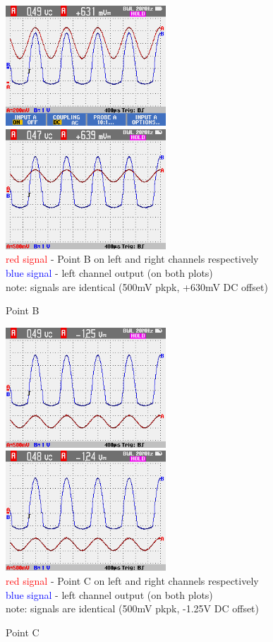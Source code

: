 \documentclass[a4paper,twoside,notitlepage]{article}
\begin{document}
\begin{figure}[hptb!]
    \centering
    \includegraphics[width=6cm]{img_report/left_point_B.png}
    \includegraphics[width=6cm]{img_report/right_point_B.png} \\ 
    \textcolor{Red}{red signal} - Point B on left and right channels respectively \\
    \textcolor{Blue}{blue signal} - left channel output (on both plots) \\
    note: signals are identical (500mV pkpk, +630mV DC offset)
 \caption{Point B}
 \label{fig:point-B}
\end{figure}

\begin{figure}[hptb!]
    \centering
    \includegraphics[width=6cm]{img_report/left_point_C.png}
    \includegraphics[width=6cm]{img_report/right_point_C.png} \\ 
    \textcolor{Red}{red signal} - Point C on left and right channels respectively \\
    \textcolor{Blue}{blue signal} - left channel output (on both plots) \\
    note: signals are identical (500mV pkpk, -1.25V DC offset)
 \caption{Point C}
 \label{fig:point-C}
\end{figure}
\end{document}
